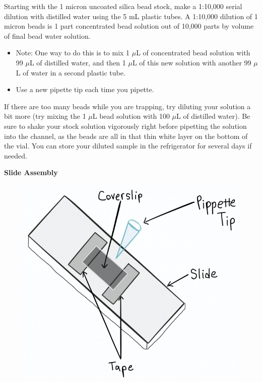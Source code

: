 \documentclass{../lab}
\begin{document}
Starting with the 1 micron uncoated silica bead stock, make a 1:10,000 serial dilution with distilled water using the 5 mL plastic tubes. A 1:10,000 dilution of 1 micron beads is 1 part concentrated bead solution out of 10,000 parts by volume of final bead water solution.

\begin{itemize}
    \item Note: One way to do this is to mix 1 $\mu$L of concentrated bead solution with 99 $\mu$L of distilled water, and then 1 $\mu$L of this new solution with another 99 $\mu$L of water in a second plastic tube.

    \item Use a new pipette tip each time you pipette.
\end{itemize}

If there are too many beads while you are trapping, try diluting your solution a bit more (try mixing the 1 $\mu$L bead solution with 100 $\mu$L of distilled water). Be sure to shake your stock solution vigorously right before pipetting the solution into the channel, as the beads are all in that thin white layer on the bottom of the vial. You can store your diluted sample in the refrigerator for several days if needed.

\textbf{Slide Assembly}

\begin{figure}[h]
    \centering
    \href{http://dev-physicsadv.pantheon.berkeley.edu/sites/default/files/images/OTZSlide.jpg}{\includegraphics[width=0.5\linewidth]{images/OTZSlide.jpg}}
    \caption{}
    \label{fig:OTZSlide}
\end{figure}
\end{document}
